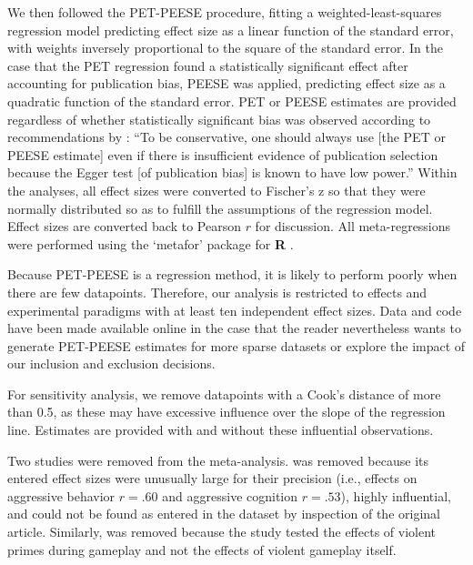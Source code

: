 \documentclass[man]{apa6}
\begin{document}
We then followed the PET-PEESE procedure, fitting a weighted-least-squares regression model predicting effect size as a linear function of the standard error, with weights inversely proportional to the square of the standard error. In the case that the PET regression found a statistically significant effect after accounting for publication bias, PEESE was applied, predicting effect size as a quadratic function of the standard error. PET or PEESE estimates are provided regardless of whether statistically significant bias was observed according to recommendations by \citet[p. 20-21]{Stanley:Doucouliagos:2013}: ``To be conservative, one should always use [the PET or PEESE estimate] even if there is insufficient evidence of publication selection because the Egger test [of publication bias] is known to have low power.'' Within the analyses, all effect sizes were converted to Fischer's z so that they were normally distributed so as to fulfill the assumptions of the regression model. Effect sizes are converted back to Pearson $r$ for discussion. All meta-regressions were performed using the `metafor' package for {\bf R} \citep{Viechtbauer:2010}.

Because PET-PEESE is a regression method, it is likely to perform poorly when there are few datapoints. Therefore, our analysis is restricted to effects and experimental paradigms with at least ten independent effect sizes. %
Data and code have been made available online in the case that the reader nevertheless wants to generate PET-PEESE estimates for more sparse datasets or explore the impact of our inclusion and exclusion decisions.

For sensitivity analysis, we remove datapoints with a Cook's distance of more than 0.5, as these may have excessive influence over the slope of the regression line. Estimates are provided with and without these influential observations.

Two studies were removed from the meta-analysis. \citet[study 1]{Matsuzaki:etal:2006} was removed because its entered effect sizes were unusually large for their precision (i.e., effects on aggressive behavior $r = .60$ and aggressive cognition $r = .53$), highly influential, and could not be found as entered in the \citet{Anderson:etal:2010} dataset by inspection of the original article. Similarly, \citet{Panee:Ballard:2002} was removed because the study tested the effects of violent primes during gameplay and not the effects of violent gameplay itself. %
\end{document}
